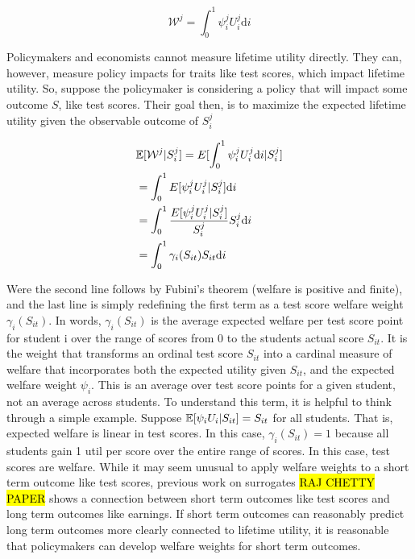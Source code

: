 \documentclass[12pt]{article}
\theoremstyle{definition}
\theoremstyle{definition}
\theoremstyle{definition}
\theoremstyle{definition}
\begin{document}
        \begin{equation}
        \mathcal{W}^j =  \int_0^1 \psi^j_i U^j_i \text{d}i
        \end{equation}

  Policymakers and economists cannot measure lifetime utility directly. They can, however, measure policy impacts for traits like test scores, which impact lifetime utility. So, suppose the policymaker is considering a policy that will impact some outcome $S$, like test scores. Their goal then, is to maximize the expected lifetime utility given the observable outcome of $S_i^j$



  
    \begin{align}
           & \mathbb{E}[\mathcal{W}^j|S_i^j] = E[\int_0^1 \psi^j_i U^j_i \text{d}i|S_i^j] \\
           & = \int_0^1 E[\psi^j_i U^j_i |S_i^j] \text{d}i \\ 
           &  = \int_0^1 \frac{E[\psi^j_i U^j_i |S_i^j]}{S_i^j} S_i^j\text{d}i \\ 
          &   = \int_0^1 \gamma_i(S_{it}) S_{it} \text{d}i
    \end{align}

   Were the second line follows by Fubini's theorem (welfare is positive and finite), and the last line is simply redefining the first term as a test score welfare weight $\gamma_i(S_{it})$. In words, $\gamma_i(S_{it})$  is the average expected welfare per test score point for student i over the range of scores from 0 to the students actual score $S_{it}$. It is the weight that transforms an ordinal test score $S_{it}$ into a cardinal measure of welfare that incorporates both the expected utility given $S_{it}$, and the expected welfare weight $\psi_i$. This is an average over test score points for a given student, not an average across students. To understand this term, it is helpful to think through a simple example. Suppose  $ \mathbb{E}[ \psi_i U_{i} |S_{it}]= S_{it}$ for all students. That is, expected welfare is linear in test scores. In this case,  $\gamma_i(S_{it}) = 1$ because all students gain 1 util per score over the entire range of scores. In this case, test scores are welfare. While it may seem unusual to apply welfare weights to a short term outcome like test scores, previous work on surrogates \hl{RAJ CHETTY PAPER} shows a connection between short term outcomes like test scores and long term outcomes like earnings. If short term outcomes can reasonably predict long term outcomes more clearly connected to lifetime utility, it is reasonable that policymakers can develop welfare weights for short term outcomes. 
\end{document}
